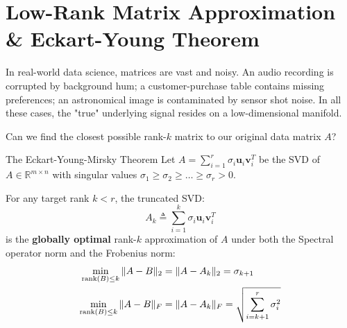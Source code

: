 \section{Low-Rank Matrix Approximation \& Eckart-Young Theorem}

In real-world data science, matrices are vast and noisy. An audio recording is corrupted by background hum; a customer-purchase table contains missing preferences; an astronomical image is contaminated by sensor shot noise. In all these cases, the "true" underlying signal resides on a low-dimensional manifold.

Can we find the closest possible rank-$k$ matrix to our original data matrix $A$?

\begin{theorembox}{The Eckart-Young-Mirsky Theorem}
Let $A = \sum_{i=1}^r \sigma_i \mathbf{u}_i \mathbf{v}_i^T$ be the SVD of $A \in \mathbb{R}^{m \times n}$ with singular values $\sigma_1 \ge \sigma_2 \ge \dots \ge \sigma_r > 0$.

For any target rank $k < r$, the truncated SVD:
\begin{equation}
A_k \triangleq \sum_{i=1}^k \sigma_i \mathbf{u}_i \mathbf{v}_i^T
\label{eq:truncated_svd_formula}
\end{equation}
is the \textbf{globally optimal} rank-$k$ approximation of $A$ under both the Spectral operator norm and the Frobenius norm:
\begin{align}
\min_{\operatorname{rank}(B) \le k} \|A - B\|_2 &= \|A - A_k\|_2 = \sigma_{k+1} \label{eq:ey_spectral_error} \\
\min_{\operatorname{rank}(B) \le k} \|A - B\|_F &= \|A - A_k\|_F = \sqrt{\sum_{i=k+1}^r \sigma_i^2} \label{eq:ey_frobenius_error}
\end{align}
\end{theorembox}

